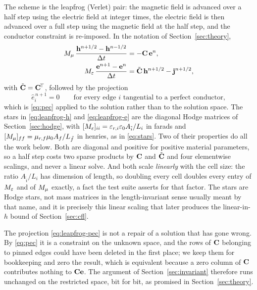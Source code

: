 The scheme is the leapfrog (Verlet) pair: the magnetic field is advanced over a half step using the electric field
at integer times, the electric field is then advanced over a full step using the magnetic field at the half step,
and the conductor constraint is re-imposed. In the notation of Section~\ref{sec:theory},
\begin{align}
  {M_{\mu}}\,\frac{\mathbf{h}^{n+1/2}-\mathbf{h}^{n-1/2}}{\Delta t} &= -\mathbf{C}\,\mathbf{e}^{n},
  \label{eq:leapfrog-h}\\
  {M_{\varepsilon}}\,\frac{\mathbf{e}^{n+1}-\mathbf{e}^{n}}{\Delta t} &= \tilde{\mathbf{C}}\,\mathbf{h}^{n+1/2}
  - \mathbf{j}^{n+1/2},
  \label{eq:leapfrog-e}
\end{align}
with $\tilde{\mathbf{C}}=\mathbf{C}^{\!\top}$, followed by the projection
\begin{equation}
  \hat e_i^{\,n+1} = 0 \qquad \text{for every edge } i \text{ tangential to a perfect conductor},
  \label{eq:leapfrog-pec}
\end{equation}
which is \eqref{eq:pec} applied to the solution rather than to the solution space. The stars in
\eqref{eq:leapfrog-h} and \eqref{eq:leapfrog-e} are the diagonal Hodge matrices of Section~\ref{sec:hodge}, with
$[{M_{\varepsilon}}]_{ii}=\varepsilon_{r,i}\varepsilon_0A_{\tilde i}/L_i$ in farads and $[{M_{\mu}}]_{ff}=\mu_{r,f}\mu_0A_f/L_{\tilde f}$ in henries,
as in \eqref{eq:stars}. Two of their properties do all the work below. Both are diagonal and positive for positive
material parameters, so a half step costs two sparse products by $\mathbf{C}$ and $\tilde{\mathbf{C}}$ and four elementwise
scalings, and never a linear solve. And both scale \emph{linearly} with the cell size: the ratio $A_{\tilde i}/L_i$
has dimension of length, so doubling every cell doubles every entry of ${M_{\varepsilon}}$ and of ${M_{\mu}}$ exactly, a fact the test
suite asserts for that factor. The stars are Hodge stars, not mass matrices in the length-invariant sense usually
meant by that name, and it is precisely this linear scaling that later produces the linear-in-$h$ bound of
Section~\ref{sec:cfl}.

The projection \eqref{eq:leapfrog-pec} is not a repair of a solution that has gone wrong. By \eqref{eq:pec} it is
a constraint on the unknown space, and the rows of $\mathbf{C}$ belonging to pinned edges could have been deleted in the
first place; we keep them for bookkeeping and zero the result, which is equivalent because a zero column of
$\mathbf{C}$ contributes nothing to $\mathbf{C}\mathbf{e}$. The argument of Section~\ref{sec:invariant} therefore runs
unchanged on the restricted space, bit for bit, as promised in Section~\ref{sec:theory}.

